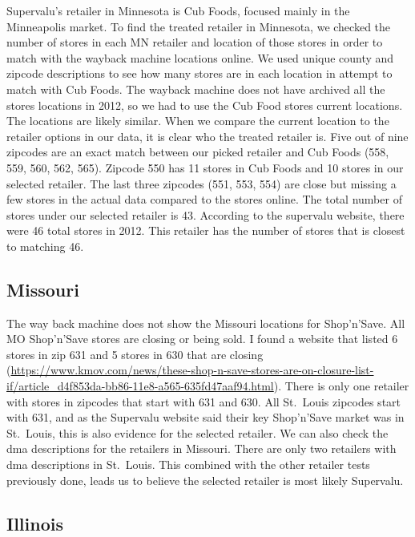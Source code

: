 \documentclass[12pt,titlepage]{mktg-article}
\begin{document}
Supervalu's retailer in Minnesota is Cub Foods, focused mainly in the Minneapolis market. To find the treated retailer in Minnesota, we checked the number of stores in each MN retailer and location of those stores in order to match with the wayback machine locations online. We used unique county and zipcode descriptions to see how many stores are in each location in attempt to match with Cub Foods. The wayback machine does not have archived all the stores locations in 2012, so we had to use the Cub Food stores current locations. The locations are likely similar. When we compare the current location to the retailer options in our data, it is clear who the treated retailer is. Five out of nine zipcodes are an exact match between our picked retailer and Cub Foods (558, 559, 560, 562, 565). Zipcode 550 has 11 stores in Cub Foods and 10 stores in our selected retailer. The last three zipcodes (551, 553, 554) are close but missing a few stores in the actual data compared to the stores online. The total number of stores under our selected retailer is 43. According to the supervalu website, there were 46 total stores in 2012. This retailer has the number of stores that is closest to matching 46.

\hypertarget{missouri}{%
\subsection{Missouri}\label{missouri}}

The way back machine does not show the Missouri locations for Shop'n'Save. All MO Shop'n'Save stores are closing or being sold. I found a website that listed 6 stores in zip 631 and 5 stores in 630 that are closing (\url{https://www.kmov.com/news/these-shop-n-save-stores-are-on-closure-list-if/article_d4f853da-bb86-11e8-a565-635fd47aaf94.html}). There is only one retailer with stores in zipcodes that start with 631 and 630. All St.~Louis zipcodes start with 631, and as the Supervalu website said their key Shop'n'Save market was in St.~Louis, this is also evidence for the selected retailer. We can also check the dma descriptions for the retailers in Missouri. There are only two retailers with dma descriptions in St.~Louis. This combined with the other retailer tests previously done, leads us to believe the selected retailer is most likely Supervalu.

\hypertarget{illinois}{%
\subsection{Illinois}\label{illinois}}
\end{document}
